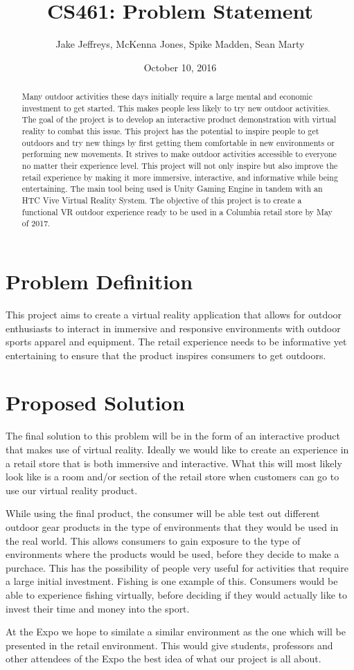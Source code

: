 \documentclass[letterpaper,10pt,titlepage]{article}
\title{CS461: Problem Statement}
\author{Jake Jeffreys, McKenna Jones, Spike Madden, Sean Marty}
\date{October 10, 2016}
\begin{document}
\begin{titlepage}
\maketitle
\begin{abstract}
Many outdoor activities these days initially require a large mental and economic
investment to get started. This makes people less likely to try new outdoor
activities. The goal of the project is to develop an interactive product
demonstration with virtual reality to combat this issue. This project has the
potential to inspire people to get outdoors and try new things by first getting
them comfortable in new environments or performing new movements. It strives to
make outdoor activities accessible to everyone no matter their experience level.
This project will not only inspire but also improve the retail experience by
making it more immersive, interactive, and informative while being
entertaining. The main tool being used is Unity Gaming Engine in tandem with an
HTC Vive Virtual Reality System. The objective of this project is to create a
functional VR outdoor experience ready to be used in a Columbia retail store by
May of 2017.
\end{abstract}
\end{titlepage}

\section{Problem Definition}
This project aims to create a virtual reality application that allows for
outdoor enthusiasts to interact in immersive and responsive environments with
outdoor sports apparel and equipment. The retail experience needs to be
informative yet entertaining to ensure that the product inspires consumers to
get outdoors.

\section{Proposed Solution}
The final solution to this problem will be in the form of an interactive
product that makes use of virtual reality. Ideally we would like to create an
experience in a retail store that is both immersive and interactive. What this
will most likely look like is a room and/or section of the retail store when
customers can go to use our virtual reality product.

While using the final product, the consumer will be able test out different
outdoor gear products in the type of environments that they would be used in
the real world. This allows consumers to gain exposure to the type of
environments where the products would be used, before they decide to make a
purchace. This has the possibility of people very useful for activities that
require a large initial investment. Fishing is one example of this. Consumers
would be able to experience fishing virtually, before deciding if they would
actually like to invest their time and money into the sport.

At the Expo we hope to similate a similar environment as the one which will be
presented in the retail environment. This would give students, professors and
other attendees of the Expo the best idea of what our project is all about.
\end{document}
